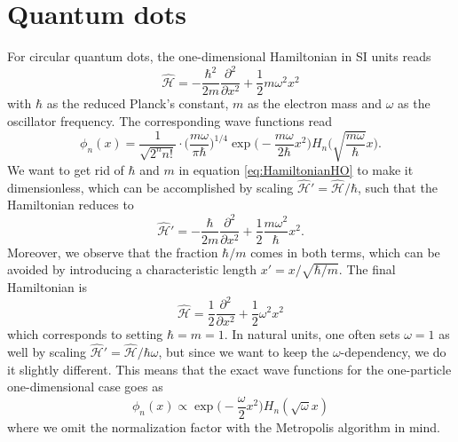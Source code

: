 \section{Quantum dots}
For circular quantum dots, the one-dimensional Hamiltonian in SI units reads
\begin{equation}
\hat{\mathcal{H}}=-\frac{\hbar^2}{2m}\frac{\partial^2}{\partial x^2}+\frac{1}{2}m\omega^2x^2
\label{eq:HamiltonianHO}
\end{equation}
with $\hbar$ as the reduced Planck's constant, $m$ as the electron mass and $\omega$ as the oscillator frequency. The corresponding wave functions read
\begin{equation}
\phi_n(x)=\frac{1}{\sqrt{2^nn!}}\cdot\bigg(\frac{m\omega}{\pi\hbar}\bigg)^{1/4}\exp\Big(-\frac{m\omega}{2\hbar}x^2\Big)H_n\Big(\sqrt{\frac{m\omega}{\hbar}}x\Big).
\end{equation}
We want to get rid of $\hbar$ and $m$ in equation \eqref{eq:HamiltonianHO} to make it dimensionless, which can be accomplished by scaling  $\hat{\mathcal{H}}'= \hat{\mathcal{H}}/\hbar$, such that the Hamiltonian reduces to
\begin{equation}
\hat{\mathcal{H}}'=-\frac{\hbar}{2m}\frac{\partial^2}{\partial x^2}+\frac{1}{2}\frac{m\omega^2}{\hbar}x^2.
\end{equation}
Moreover, we observe that the fraction $\hbar/m$ comes in both terms, which can be avoided by introducing a characteristic length $x'= x/\sqrt{\hbar/m}$. The final Hamiltonian is
\begin{equation}
\hat{\mathcal{H}}=\frac{1}{2}\frac{\partial^2}{\partial x^2}+\frac{1}{2}\omega^2x^2
\end{equation}
which corresponds to setting $\hbar=m=1$. In natural units, one often sets $\omega=1$ as well by scaling $\hat{\mathcal{H}}'=\hat{\mathcal{H}}/\hbar\omega$, but since we want to keep the $\omega$-dependency, we do it slightly different. This means that the exact wave functions for the one-particle one-dimensional case goes as
\begin{equation}
\phi_n(x)\propto\exp\Big(-\frac{\omega}{2}x^2\Big)H_n(\sqrt{\omega}x)
\end{equation}
where we omit the normalization factor with the Metropolis algorithm in mind. 

